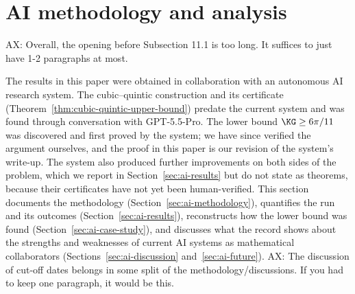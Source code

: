 

\hypersetup{
  colorlinks=true,
  linkcolor=blue!55!black,
  urlcolor=blue!55!black,
  citecolor=blue!55!black
}

\setlength{\parindent}{0pt}
\setlength{\parskip}{6pt}

\section{AI methodology and analysis}
\label{sec:ai}

{\color{red}AX: Overall, the opening before Subsection 11.1 is too long. It suffices to just have 1-2 paragraphs at most.}

The results in this paper were obtained in collaboration with an autonomous
AI research system. The cubic--quintic
construction and its certificate (Theorem~\ref{thm:cubic-quintic-upper-bound})
predate the current system and was found through conversation with GPT-5.5-Pro. The lower bound $\KG\ge6\pi/11$ was
discovered and first proved by the system; we have since verified the
argument ourselves, and the proof in this paper is our revision of the
system's write-up. The system also produced further improvements on both
sides of the problem, which we report in Section~\ref{sec:ai-results} but do
not state as theorems, because their certificates have not yet been human-verified. This section documents the methodology
(Section~\ref{sec:ai-methodology}), quantifies the run and its outcomes
(Section~\ref{sec:ai-results}), reconstructs how the lower bound was found
(Section~\ref{sec:ai-case-study}), and discusses what the record shows about
the strengths and weaknesses of current AI systems as mathematical
collaborators (Sections~\ref{sec:ai-discussion} and~\ref{sec:ai-future}).
{\color{red}AX: The discussion of cut-off dates belongs in some split of the methodology/discussions.
If you had to keep one paragraph, it would be this.
}


